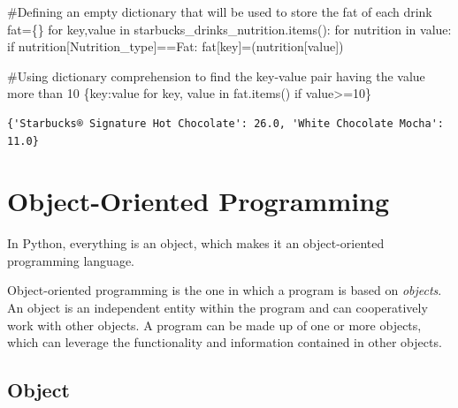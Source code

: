 \documentclass[
  letterpaper,
  DIV=11,
  numbers=noendperiod]{scrreprt}
\newenvironment{Shaded}{\begin{snugshade}}{\end{snugshade}}
\newcommand{\CommentTok}[1]{\textcolor[rgb]{0.37,0.37,0.37}{#1}}
\newcommand{\ControlFlowTok}[1]{\textcolor[rgb]{0.00,0.23,0.31}{#1}}
\newcommand{\DecValTok}[1]{\textcolor[rgb]{0.68,0.00,0.00}{#1}}
\newcommand{\KeywordTok}[1]{\textcolor[rgb]{0.00,0.23,0.31}{#1}}
\newcommand{\NormalTok}[1]{\textcolor[rgb]{0.00,0.23,0.31}{#1}}
\newcommand{\OperatorTok}[1]{\textcolor[rgb]{0.37,0.37,0.37}{#1}}
\newcommand{\StringTok}[1]{\textcolor[rgb]{0.13,0.47,0.30}{#1}}
\begin{document}
\begin{Shaded}
\begin{Highlighting}[]
\CommentTok{\#Defining an empty dictionary that will be used to store the fat of each drink}
\NormalTok{fat}\OperatorTok{=}\NormalTok{\{\}}
\ControlFlowTok{for}\NormalTok{ key,value }\KeywordTok{in}\NormalTok{ starbucks\_drinks\_nutrition.items():}
    \ControlFlowTok{for}\NormalTok{ nutrition }\KeywordTok{in}\NormalTok{ value:        }
        \ControlFlowTok{if}\NormalTok{ nutrition[}\StringTok{\textquotesingle{}Nutrition\_type\textquotesingle{}}\NormalTok{]}\OperatorTok{==}\StringTok{\textquotesingle{}Fat\textquotesingle{}}\NormalTok{:}
\NormalTok{            fat[key]}\OperatorTok{=}\NormalTok{(nutrition[}\StringTok{\textquotesingle{}value\textquotesingle{}}\NormalTok{])}
            
\CommentTok{\#Using dictionary comprehension to find the key{-}value pair having the value more than 10}
\NormalTok{\{key:value }\ControlFlowTok{for}\NormalTok{ key, value }\KeywordTok{in}\NormalTok{ fat.items() }\ControlFlowTok{if}\NormalTok{ value}\OperatorTok{\textgreater{}=}\DecValTok{10}\NormalTok{\}}
\end{Highlighting}
\end{Shaded}

\begin{verbatim}
{'Starbucks® Signature Hot Chocolate': 26.0, 'White Chocolate Mocha': 11.0}
\end{verbatim}

\hypertarget{object-oriented-programming}{%
\chapter{Object-Oriented
Programming}\label{object-oriented-programming}}

In Python, everything is an object, which makes it an object-oriented
programming language.

Object-oriented programming is the one in which a program is based on
\emph{objects}. An object is an independent entity within the program
and can cooperatively work with other objects. A program can be made up
of one or more objects, which can leverage the functionality and
information contained in other objects.

\hypertarget{object}{%
\section{Object}\label{object}}
\end{document}

